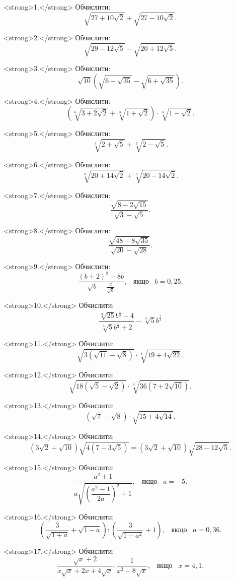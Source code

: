 <strong>1.</strong> Обчислити:
$$\sqrt{27 + 10\sqrt{2}} + \sqrt{27 - 10\sqrt{2}}.$$

<strong>2.</strong> Обчислити:
$$\sqrt{29 - 12\sqrt{5}} - \sqrt{20 + 12\sqrt{5}}.$$

<strong>3.</strong> Обчислити:
$$\sqrt{10}\left(\sqrt{6 - \sqrt{35}} - \sqrt{6 + \sqrt{35}}\right).$$

<strong>4.</strong> Обчислити:
$$\left(\sqrt[6]{3 + 2\sqrt{2}} + \sqrt[3]{1 + \sqrt{2}}\right) \cdot \sqrt[3]{1 - \sqrt{2}}.$$

<strong>5.</strong> Обчислити:
$$\sqrt[3]{2 + \sqrt{5}} + \sqrt[3]{2 - \sqrt{5}}.$$

<strong>6.</strong> Обчислити:
$$\sqrt[3]{20 + 14\sqrt{2}} + \sqrt[3]{20 - 14\sqrt{2}}.$$

<strong>7.</strong> Обчислити:
$$\frac{\sqrt{8 - 2\sqrt{15}}}{\sqrt{3} - \sqrt{5}}.$$

<strong>8.</strong> Обчислити:
$$\frac{\sqrt{48 - 8\sqrt{35}}}{\sqrt{20} - \sqrt{28}}.$$

<strong>9.</strong> Обчислити:
$$\frac{\left(b + 2\right)^2 - 8b}{\sqrt{b} - \frac{2}{\sqrt{b}}}, \;\;\; \mbox{якщо} \;\;\; b = 0,25.$$

<strong>10.</strong> Обчислити:
$$\frac{\sqrt[3]{25}b^{\frac{1}{3}} - 4}{\sqrt[3]{5}b^{\frac{1}{3}} + 2} - \sqrt[3]{5}b^{\frac{1}{3}} $$

<strong>11.</strong> Обчислити:
$$\sqrt{3\left(\sqrt{11} - \sqrt{8}\right)} \cdot \sqrt[4]{19 + 4\sqrt{22}}.$$

<strong>12.</strong> Обчислити:
$$\sqrt{18\left(\sqrt{5} - \sqrt{2}\right)} \cdot \sqrt[4]{36\left(7 + 2\sqrt{10}\right)}.$$

<strong>13.</strong> Обчислити:
$$\left(\sqrt{7} - \sqrt{8}\right) \cdot \sqrt{15 + 4\sqrt{14}}.$$

<strong>14.</strong> Обчислити:
$$\left(3\sqrt{2} + \sqrt{10}\right) \sqrt{4\left(7 - 3\sqrt{5}\right)} =
\left(3\sqrt{2} + \sqrt{10}\right) \sqrt{28 - 12\sqrt{5}}.$$

<strong>15.</strong> Обчислити:
$$\dfrac{a^2 + 1}{a\sqrt{\left(\dfrac{a^2 - 1}{2a}\right)^2  + 1}}, \;\;\; \mbox{якщо} \;\;\; a = -5.$$

<strong>16.</strong> Обчислити:
$$\left(\dfrac{3}{\sqrt{1 + a}} + \sqrt{1 - a}\right) : \left(\dfrac{3}{\sqrt{1 - a^2}} + 1\right),
\;\;\; \mbox{якщо}  \;\;\; a = 0,36.$$

<strong>17.</strong> Обчислити:
$$\dfrac{\sqrt{x} + 2}{x\sqrt{x} + 2x + 4\sqrt{x}} : \dfrac{1}{x^2 - 8\sqrt{x}}, \;\;\; \mbox{якщо} \;\;\; x = 4,1.$$

